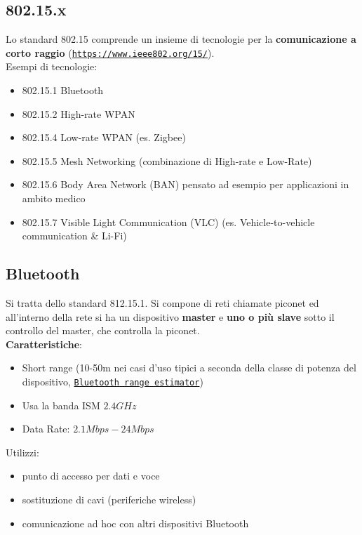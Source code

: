 \subsection{802.15.x}
Lo standard 802.15 comprende un insieme di tecnologie per la \textbf{comunicazione a corto raggio} (\texttt{\url{https://www.ieee802.org/15/}}).\\

Esempi di tecnologie: 
\begin{itemize}
	\item 802.15.1 Bluetooth
	\item 802.15.2 High-rate WPAN
	\item 802.15.4 Low-rate WPAN (es. Zigbee)
	\item 802.15.5 Mesh Networking (combinazione di High-rate e Low-Rate)
	\item 802.15.6 Body Area Network (BAN) pensato ad esempio per applicazioni in ambito medico
	\item 802.15.7 Visible Light Communication (VLC) (es. Vehicle-to-vehicle communication \& Li-Fi)
\end{itemize}

\subsection{Bluetooth}
Si tratta dello standard 812.15.1. Si compone di reti chiamate piconet ed all'interno della rete si ha un dispositivo \textbf{master} e \textbf{uno o più slave} sotto il controllo del master, che controlla la piconet.\\

\textbf{Caratteristiche}: 
\begin{itemize}
	\item Short range (10-50m nei casi d'uso tipici a seconda della classe di potenza del dispositivo, \texttt{\href{https://www.bluetooth.com/learn-about-bluetooth/key-attributes/range/\#estimator}{Bluetooth range estimator}})
	\item Usa la banda ISM $2.4GHz$
	\item Data Rate: $2.1 Mbps - 24Mbps$
\end{itemize}

Utilizzi: 
\begin{itemize}
	\item punto di accesso per dati e voce
	\item sostituzione di cavi (periferiche wireless)
	\item comunicazione ad hoc con altri dispositivi Bluetooth
\end{itemize}

